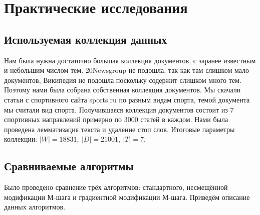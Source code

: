 \documentclass[12pt]{article}
\begin{document}
	\section{Практические исследования}
\subsection{Используемая коллекция данных}
Нам была нужна достаточно большая коллекция документов, с заранее известным  и небольшим числом тем. 20Newsgroup не подошла, так как там слишком мало документов, Википедия не подошла поскольку содержит слишком много тем. Поэтому нами была собрана собственная коллекция документов. Мы скачали статьи с спортивного сайта sports.ru по разным видам спорта, темой документа мы считали вид спорта. Получившаяся коллекция документов состоит из 7 спортивных направлений примерно по 3000 статей в каждом. Нами была проведена лемматизация текста и удаление стоп слов. Итоговые параметры коллекции: $|W| = 18831,~|D| = 21001,~|T| = 7$.
	\subsection{Сравниваемые алгоритмы}
Было проведено сравнение трёх алгоритмов: стандартного, несмещённой модификации М-шага и градиентной модификации М-шага. Приведём описание данных алгоритмов.
\end{document}
